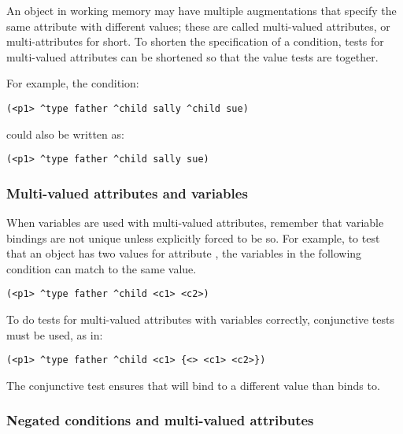 An object in working memory may have multiple augmentations that specify
the same attribute with different values; these are called multi-valued
attributes, or multi-attributes for short.  To shorten the specification
of a condition, tests for multi-valued attributes can be shortened so
that the value tests are together.

For example, the condition:
\begin{verbatim}
(<p1> ^type father ^child sally ^child sue)
\end{verbatim}

could also be written as:
\begin{verbatim}
(<p1> ^type father ^child sally sue)
\end{verbatim}


\subsubsection*{Multi-valued attributes and variables}

When variables are used with multi-valued attributes, remember that
variable bindings are not unique unless explicitly forced to be so. For
example, to test that an object has two values for attribute
, the variables in the following condition can match to the same
value.

\begin{verbatim}
(<p1> ^type father ^child <c1> <c2>)
\end{verbatim} \vspace{12pt}

To do tests for multi-valued attributes with variables correctly,
conjunctive tests must be used, as in:

\begin{verbatim}
(<p1> ^type father ^child <c1> {<> <c1> <c2>})
\end{verbatim} \vspace{12pt}

The conjunctive test  ensures that  will
bind to a different value than  binds to.


\subsubsection*{Negated conditions and multi-valued attributes}

